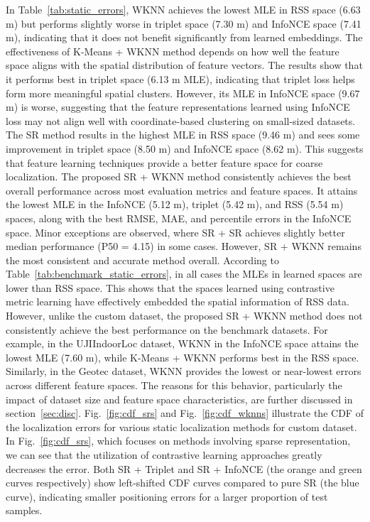 \documentclass[journal,twoside,web]{ieeecolor}
\begin{document}
In Table~\ref{tab:static_errors}, WKNN achieves the lowest MLE in RSS space (6.63 m) but performs slightly worse in triplet space (7.30 m) and InfoNCE space (7.41 m), indicating that it does not benefit significantly from learned embeddings. The effectiveness of K-Means + WKNN method depends on how well the feature space aligns with the spatial distribution of feature vectors. The results show that it performs best in triplet space (6.13 m MLE), indicating that triplet loss helps form more meaningful spatial clusters. However, its MLE in InfoNCE space (9.67 m) is worse, suggesting that the feature representations learned using InfoNCE loss may not align well with coordinate-based clustering on small-sized datasets. The SR method results in the highest MLE in RSS space (9.46 m) and sees some improvement in triplet space (8.50 m) and InfoNCE space (8.62 m). This suggests that feature learning techniques provide a better feature space for coarse localization.
The proposed SR + WKNN method consistently achieves the best overall performance across most evaluation metrics and feature spaces. It attains the lowest MLE in the InfoNCE (5.12 m), triplet (5.42 m), and RSS (5.54 m) spaces, along with the best RMSE, MAE, and percentile errors in the InfoNCE space.
Minor exceptions are observed, where SR + SR achieves slightly better median performance (P50 = 4.15) in some cases.
However, SR + WKNN remains the most consistent and accurate method overall.
According to Table~\ref{tab:benchmark_static_errors}, in all cases the MLEs in learned spaces are lower than RSS space. This shows that the spaces learned using contrastive metric learning have effectively embedded the spatial information of RSS data.
However, unlike the custom dataset, the proposed SR + WKNN method does not consistently achieve the best performance on the benchmark datasets. 
For example, in the UJIIndoorLoc dataset, WKNN in the InfoNCE space attains the lowest MLE (7.60 m), while K-Means + WKNN performs best in the RSS space. 
Similarly, in the Geotec dataset, WKNN provides the lowest or near-lowest errors across different feature spaces. 
The reasons for this behavior, particularly the impact of dataset size and feature space characteristics, are further discussed in section~\ref{sec:disc}.
Fig.~\ref{fig:cdf_srs} and Fig.~\ref{fig:cdf_wknns} illustrate the CDF of the localization errors for various static localization methods for custom dataset.
In Fig.~\ref{fig:cdf_srs}, which focuses on methods involving sparse representation, we can see that the utilization of contrastive learning approaches greatly decreases the error. Both SR + Triplet and SR + InfoNCE (the orange and green curves respectively) show left-shifted CDF curves compared to pure SR (the blue curve), indicating smaller positioning errors for a larger proportion of test samples.
\end{document}
